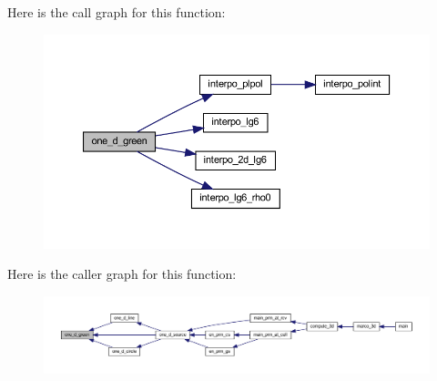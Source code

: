 Here is the call graph for this function\+:
\nopagebreak
\begin{figure}[H]
\begin{center}
\leavevmode
\includegraphics[width=350pt]{Marco_8f90_a8366534c83a3217b6271dd5a9d5b8917_cgraph}
\end{center}
\end{figure}
Here is the caller graph for this function\+:
\nopagebreak
\begin{figure}[H]
\begin{center}
\leavevmode
\includegraphics[width=350pt]{Marco_8f90_a8366534c83a3217b6271dd5a9d5b8917_icgraph}
\end{center}
\end{figure}
\mbox{\label{Marco_8f90_a70d6bf0b4adeb475f694e6aaa1c9582f}} 
